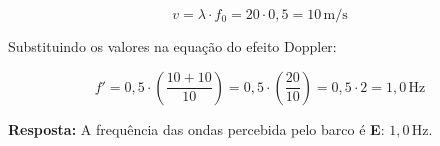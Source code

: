 \documentclass[a4paper,12pt]{article}
\begin{document}
\begin{flushleft}
\begin{equation}
v = \lambda \cdot f_0 = 20 \cdot 0{,}5 = 10\,\text{m/s}
\end{equation}

\noindent
Substituindo os valores na equação do efeito Doppler:

\begin{equation}
f' = 0{,}5 \cdot \left( \frac{10 + 10}{10} \right) = 0{,}5 \cdot \left( \frac{20}{10} \right) = 0{,}5 \cdot 2 = 1{,}0\,\text{Hz}
\end{equation}

\noindent
\textbf{Resposta:} A frequência das ondas percebida pelo barco é \colorbox{green!50}{\textbf{E}}: \( \boxed{1{,}0\,\text{Hz}} \).

\end{flushleft}
\end{document}
